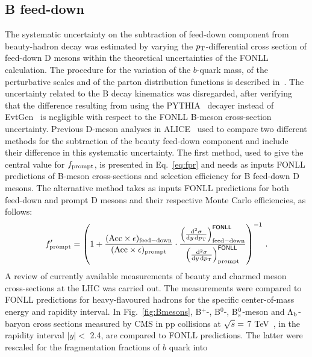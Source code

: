 \subsection{B feed-down}
\label{sec:BfdSub}
The systematic uncertainty on the subtraction of feed-down component from 
beauty-hadron decay was estimated by varying the $p_{\rm T}$-differential 
cross section of feed-down D mesons within the theoretical uncertainties
of the FONLL calculation. The procedure for the variation of the $b$-quark mass, 
of the perturbative scales and of the parton distribution functions is described 
in~\cite{Cacciari:2012ny}. The uncertainty related to the B decay 
kinematics was disregarded, after verifying that the difference resulting 
from using the PYTHIA~\cite{Sjostrand:2006za} decayer instead of 
EvtGen~\cite{Lange:2001uf} is negligible 
with respect to the FONLL B-meson cross-section uncertainty.
Previous D-meson analyses in 
ALICE~\cite{ALICE:2011aa,Adam:2016ich,Adam:2015jda} 
used to compare two different methods for the subtraction of the beauty feed-down component 
and include their difference in this systematic uncertainty. 
The first method, used to give the central value for $f_{\rm prompt}$, 
is presented in Eq.~\ref{eq:fpr} and needs as inputs FONLL predictions
of B-meson cross-sections and selection efficiency for B feed-down 
D mesons. The alternative method takes as inputs FONLL predictions for both 
feed-down and prompt D mesons and their respective Monte Carlo efficiencies, 
as follows:
\begin{equation}
f^\prime_{\rm prompt} = \left( 	1 + 	\frac{({\rm Acc}\times\epsilon)_{{\rm feed-down}}}{({\rm Acc}\times\epsilon)_{{\rm prompt}}}	\cdot
		 \frac{ \left(\frac{{\rm d}^2 \sigma}{{\rm d}y \, {\rm d} p_{\rm T} } \right)^{{\sf FONLL}}_{{\rm feed-down}} }{ \left(\frac{{\rm d}^2 \sigma}{{\rm d}y \, {\rm d} p_{\rm T} } \right)^{{\sf FONLL}}_{ {\rm prompt} } } 
\right)^{-1} \, .
\label{eq:fc}
\end{equation}
A review of currently available measurements of beauty and 
charmed meson cross-sections at the LHC was carried out. The measurements 
were compared to FONLL predictions for heavy-flavoured hadrons 
for the specific center-of-mass energy and rapidity interval.
In Fig.~\ref{fig:Bmesons}, B$^{+}$-, B$^{0}$-, B$^0_{\rm s}$-meson and 
$\Lambda_{\rm b}$-baryon cross sections measured by CMS in pp collisions 
at $\sqrt{s} = $ 7 TeV~\cite{Khachatryan:2011mk,Chatrchyan:2011pw,Chatrchyan:2011vh,Chatrchyan:2012xg},
in the rapidity interval $|y| <$ 2.4, are compared to FONLL predictions. 
The latter were rescaled for the fragmentation fractions of $b$ quark into 
